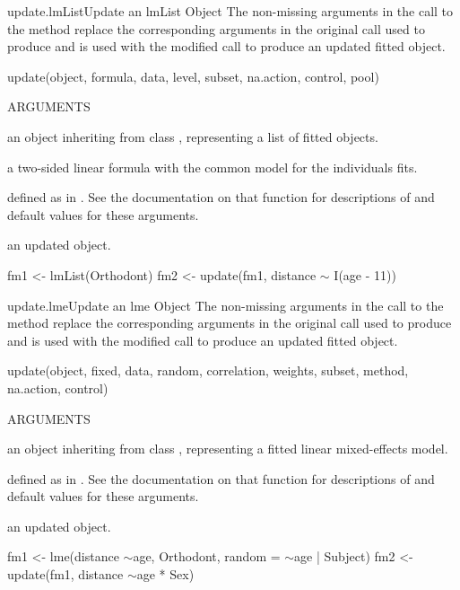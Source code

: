 \documentclass[pdftex]{article} \usepackage{url,graphicx}
\renewcommand{\Twiddle}{\mbox{\(\sim\)}}
\begin{document}
\begin{Helpfile}{update.lmList}{Update an lmList Object}
The non-missing arguments in the call to the  method
replace the corresponding arguments in the original call used to
produce  and  is used with the modified call to
produce an updated fitted object.
\begin{Example}
update(object, formula, data, level, subset, na.action, 
       control, pool)
\end{Example}
\begin{Argument}{ARGUMENTS}
\item[\Co{object:}]
an object inheriting from class , representing
a list of  fitted objects.
\item[\Co{formula:}]
a two-sided linear formula with the common model for the individuals
 fits.
\item[\Co{other arguments:}]
defined as in . See the
documentation on that function for descriptions of and default values
for these arguments.
\end{Argument}
an updated  object.
\need 15pt
\vspace{-16pt}
\begin{Example}
fm1 <- lmList(Orthodont)
fm2 <- update(fm1, distance {\Twiddle} I(age - 11))
\end{Example}
\end{Helpfile}
\begin{Helpfile}{update.lme}{Update an lme Object}
The non-missing arguments in the call to the  method
replace the corresponding arguments in the original call used to
produce  and  is used with the modified call to
produce an updated fitted object.
\begin{Example}
update(object, fixed, data, random, correlation, weights, 
       subset, method, na.action, control)
\end{Example}
\begin{Argument}{ARGUMENTS}
\item[\Co{object:}]
an object inheriting from class , representing
a fitted linear mixed-effects model.
\item[\Co{other arguments:}]
defined as in . See the
documentation on that function for descriptions of and default values
for these arguments.
\end{Argument}
an updated  object.
\need 15pt
\vspace{-16pt} 
\begin{Example}
fm1 <- lme(distance \Twiddle age, Orthodont, random = \Twiddle age | Subject)
fm2 <- update(fm1, distance \Twiddle age * Sex)
\end{Example}
\end{Helpfile}
\end{document}
